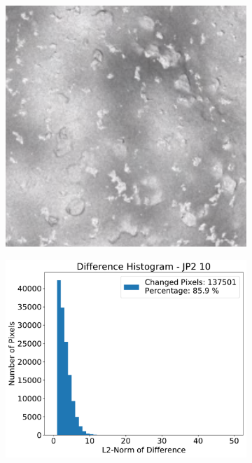 \begin{figure}[htb]
    \centering
    \begin{subfigure}[b]{0.48\textwidth}
        \centering
        \includegraphics[width=\textwidth]{doc/thesis/0_figures/compare_quality/set1/jp2_10_center}
        \caption{}
        \label{fig:img_quality_comp_jp2_10_center_orig}
    \end{subfigure}
    \begin{subfigure}[b]{0.48\textwidth}
        \centering
        \includegraphics[width=\textwidth]{doc/thesis/0_figures/compare_quality/set1/jp2_10_center_diff_histogram}

\end{subfigure}
\end{figure}
